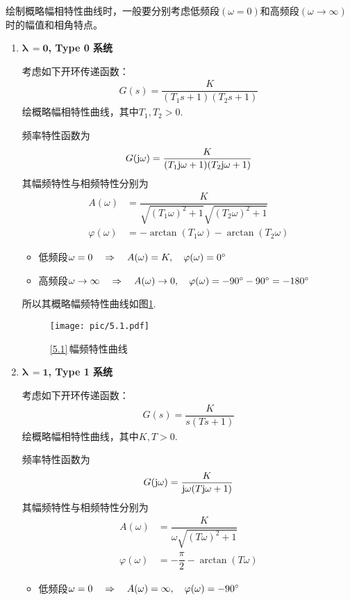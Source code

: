 绘制概略幅相特性曲线时，一般要分别考虑低频段$(\omega = 0)$和高频段$(\omega \to \infty)$时的幅值和相角特点。

\begin{enumerate}[1.]
	\item \textbf{$\bm{\lambda}\,  \mathbf{= 0}$, Type 0 系统}
	
	\examples \label{5.1}考虑如下开环传递函数：
	\begin{align*}
		G(s) = \dfrac{K}{(T_1 s + 1)(T_2 s + 1)}
	\end{align*}
	绘概略幅相特性曲线，其中$T_1,T_2 > 0$.
	
	\solve 频率特性函数为
	\begin{align*}
		G(\text{j} \omega) = \dfrac{K}{(T_1 \text{j} \omega + 1)(T_2 \text{j} \omega + 1)}
	\end{align*}
	其幅频特性与相频特性分别为
	\begin{align*}
		A(\omega) &= \dfrac{K}{\sqrt{(T_1 \omega )^2 + 1} \sqrt{(T_2 \omega)^2 + 1}}\\
		\varphi(\omega) &= - \arctan(T_1 \omega) - \arctan(T_2 \omega)
	\end{align*}
\begin{itemize}
	\item 低频段\quad $\omega = 0 \quad \Rightarrow \quad A(\omega) = K,\quad \varphi(\omega) = 0{}^{\circ} $
	
	\item 高频段\quad $\omega \to \infty \quad \Rightarrow \quad A(\omega) \to 0,\quad \varphi(\omega) = -90{}^{\circ} - 90 {}^{\circ} = -180 {}^{\circ}$
\end{itemize}
所以其概略幅频特性曲线如图\ref{F5.1}.
\begin{figure}[!htb]
	\centering
	\texttt{[image: pic/5.1.pdf]}
	\caption{\ref{5.1}$\,$幅频特性曲线}
	\label{F5.1}
\end{figure}

\item \textbf{$\bm{\lambda}\,  \mathbf{= 1}$, Type 1 系统}

\examples \label{5.2}考虑如下开环传递函数：
\begin{align*}
	G(s) = \dfrac{K}{s(T s + 1)}
\end{align*}
绘概略幅相特性曲线，其中$K,T > 0$.

\solve 频率特性函数为
\begin{align*}
	G(\text{j} \omega) = \dfrac{K}{\text{j} \omega (T \text{j} \omega +1)}
\end{align*}
其幅频特性与相频特性分别为
\begin{align*}
	A(\omega) &= \dfrac{K}{\omega \sqrt{(T \omega)^2 + 1}}\\[0.5em]
	\varphi(\omega) &= - \dfrac{\pi}{2} - \arctan(T \omega)
\end{align*}
\begin{itemize}
	\item 低频段\quad $\omega = 0 \quad \Rightarrow \quad A(\omega) = \infty ,\quad \varphi(\omega) = -90{}^{\circ} $
	

\end{itemize}
\end{enumerate}
